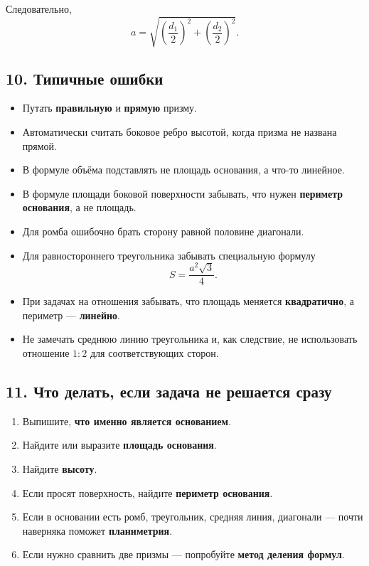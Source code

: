 \documentclass[a4paper,12pt]{article}
\newcommand{\Area}{S}
\begin{document}
Следовательно,
\[
a=\sqrt{\left(\frac{d_1}{2}\right)^2+\left(\frac{d_2}{2}\right)^2}.
\]

\subsection*{10. Типичные ошибки}

\begin{itemize}
    \item Путать \textbf{правильную} и \textbf{прямую} призму.
    \item Автоматически считать боковое ребро высотой, когда призма не названа прямой.
    \item В формуле объёма подставлять не площадь основания, а что-то линейное.
    \item В формуле площади боковой поверхности забывать, что нужен \textbf{периметр основания}, а не площадь.
    \item Для ромба ошибочно брать сторону равной половине диагонали.
    \item Для равностороннего треугольника забывать специальную формулу
    \[
    \Area=\frac{a^2\sqrt{3}}{4}.
    \]
    \item При задачах на отношения забывать, что площадь меняется \textbf{квадратично}, а периметр --- \textbf{линейно}.
    \item Не замечать среднюю линию треугольника и, как следствие, не использовать отношение $1:2$ для соответствующих сторон.
\end{itemize}

\subsection*{11. Что делать, если задача не решается сразу}

\begin{enumerate}
    \item Выпишите, \textbf{что именно является основанием}.
    \item Найдите или выразите \textbf{площадь основания}.
    \item Найдите \textbf{высоту}.
    \item Если просят поверхность, найдите \textbf{периметр основания}.
    \item Если в основании есть ромб, треугольник, средняя линия, диагонали --- почти наверняка поможет \textbf{планиметрия}.
    \item Если нужно сравнить две призмы --- попробуйте \textbf{метод деления формул}.
\end{enumerate}
\end{document}
